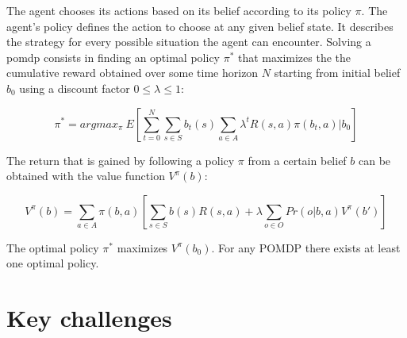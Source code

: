 The agent chooses its actions based on its belief according to its policy $\pi$. The agent's policy defines the action to choose at any given belief state. It describes the strategy for every possible situation the agent can encounter. Solving a \gls{pomdp} consists in finding an optimal policy $\pi^*$ that maximizes the the cumulative reward obtained over some time horizon $N$ starting from initial belief $b_0$ using a discount factor $0 \leq \lambda \leq 1$:

\begin{equation}
    \pi^* = argmax_{\pi}~E\left[ \sum_{t=0}^{N} \sum_{s \in S}b_t(s) \sum_{a \in A} \lambda^t R(s,a) \pi(b_t,a) | b_0\right]
\end{equation}

The return that is gained by following a policy $\pi$ from a certain belief $b$ can be obtained with the value function $V^\pi(b)$:

\begin{equation}
    V^\pi(b) = \sum_{a \in A} \pi(b,a) \left[ \sum_{s \in S} b(s) R(s,a) + \lambda \sum_{o \in O} Pr(o | b, a) V^\pi(b')\right]
\end{equation}

The optimal policy $\pi^*$ maximizes $V^\pi(b_0)$. For any POMDP there exists at least one optimal policy.

\section{Key challenges}






